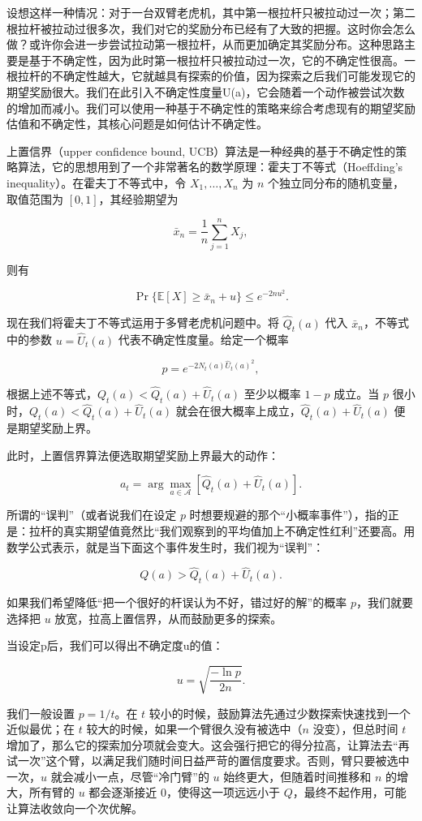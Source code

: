设想这样一种情况：对于一台双臂老虎机，其中第一根拉杆只被拉动过一次；第二根拉杆被拉动过很多次，我们对它的奖励分布已经有了大致的把握。这时你会怎么做？或许你会进一步尝试拉动第一根拉杆，从而更加确定其奖励分布。这种思路主要是基于不确定性，因为此时第一根拉杆只被拉动过一次，它的不确定性很高。一根拉杆的不确定性越大，它就越具有探索的价值，因为探索之后我们可能发现它的期望奖励很大。我们在此引入不确定性度量U(a)，它会随着一个动作被尝试次数的增加而减小。我们可以使用一种基于不确定性的策略来综合考虑现有的期望奖励估值和不确定性，其核心问题是如何估计不确定性。

上置信界（upper confidence bound, UCB）算法是一种经典的基于不确定性的策略算法，它的思想用到了一个非常著名的数学原理：霍夫丁不等式（Hoeffding's inequality）。在霍夫丁不等式中，令 \(X_1,\ldots,X_n\) 为 \(n\) 个独立同分布的随机变量，取值范围为 \([0,1]\)，其经验期望为

\[
\bar{x}_n=\frac{1}{n}\sum_{j=1}^{n} X_j,
\]

则有

\[
\Pr\{\mathbb{E}[X]\ge \bar{x}_n+u\}\le e^{-2nu^{2}}.
\]

现在我们将霍夫丁不等式运用于多臂老虎机问题中。将 \(\hat{Q}_t(a)\) 代入 \(\bar{x}_n\)，不等式中的参数 \(u=\hat{U}_t(a)\) 代表不确定性度量。给定一个概率

\[
p=e^{-2N_t(a)\hat{U}_t(a)^{2}},
\]

根据上述不等式，\(Q_t(a)<\hat{Q}_t(a)+\hat{U}_t(a)\) 至少以概率 \(1-p\) 成立。当 \(p\) 很小时，\(Q_t(a)<\hat{Q}_t(a)+\hat{U}_t(a)\) 就会在很大概率上成立，\(\hat{Q}_t(a)+\hat{U}_t(a)\) 便是期望奖励上界。

此时，上置信界算法便选取期望奖励上界最大的动作：

\[
a_t=\arg\max_{a\in\mathcal{A}}[\hat{Q}_t(a)+\hat{U}_t(a)].
\]

所谓的``误判''（或者说我们在设定 \(p\) 时想要规避的那个``小概率事件''），指的正是：拉杆的真实期望值竟然比``我们观察到的平均值加上不确定性红利''还要高。用数学公式表示，就是当下面这个事件发生时，我们视为``误判''：

\[
Q(a)>\hat{Q}_t(a)+\hat{U}_t(a).
\]

如果我们希望降低``把一个很好的杆误认为不好，错过好的解''的概率 \(p\)，我们就要选择把 \(u\) 放宽，拉高上置信界，从而鼓励更多的探索。

当设定p后，我们可以得出不确定度u的值：

\[
u=\sqrt{\frac{-\ln p}{2n}}.
\]

我们一般设置 \(p=1/t\)。在 \(t\) 较小的时候，鼓励算法先通过少数探索快速找到一个近似最优；在 \(t\) 较大的时候，如果一个臂很久没有被选中（\(n\) 没变），但总时间 \(t\) 增加了，那么它的探索加分项就会变大。这会强行把它的得分拉高，让算法去``再试一次''这个臂，以满足我们随时间日益严苛的置信度要求。否则，臂只要被选中一次，\(u\) 就会减小一点，尽管``冷门臂''的 \(u\) 始终更大，但随着时间推移和 \(n\) 的增大，所有臂的 \(u\) 都会逐渐接近 \(0\)，使得这一项远远小于 \(Q\)，最终不起作用，可能让算法收敛向一个次优解。

